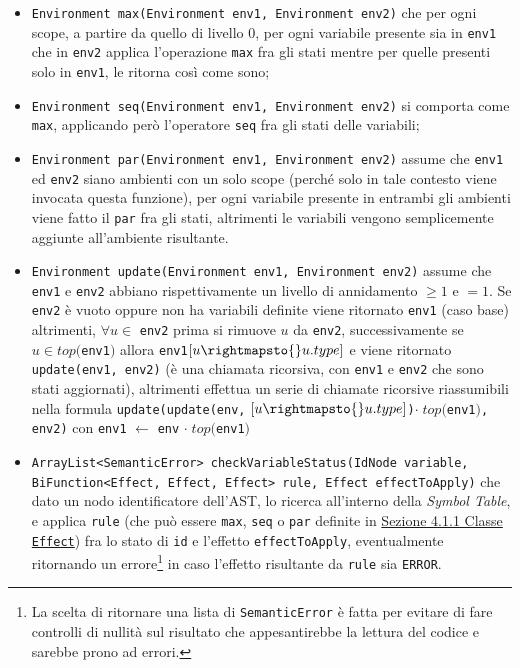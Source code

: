 \documentclass[../report.tex]{subfiles}
\begin{document}
\begin{itemize}
    \item \verb|Environment max(Environment env1, Environment env2)| che per ogni scope, a partire da quello di livello $0$, per ogni variabile presente sia in \verb|env1| che in \verb|env2| applica l'operazione \verb|max| fra gli stati mentre per quelle presenti solo in \verb|env1|, le ritorna così come sono;
    \item \verb|Environment seq(Environment env1, Environment env2)| si comporta come \verb|max|, applicando però l'operatore \verb|seq| fra gli stati delle variabili;
    \item \verb|Environment par(Environment env1, Environment env2)| assume che \verb|env1| ed \verb|env2| siano ambienti con un solo scope (perché solo in tale contesto viene invocata questa funzione), per ogni variabile presente in entrambi gli ambienti viene fatto il \verb|par| fra gli stati, altrimenti le variabili vengono semplicemente aggiunte all'ambiente risultante.
    \item \verb|Environment update(Environment env1, Environment env2)| assume che \verb|env1| e \verb|env2| abbiano rispettivamente un livello di annidamento $\geq{} 1$ e $= 1$.
    Se \verb|env2| è vuoto oppure non ha variabili definite viene ritornato \verb|env1| (caso base) altrimenti, $\forall u \in$ \verb|env2| prima si rimuove $u$ da \verb|env2|, successivamente se $u \in top($\verb|env1|$)$ allora \verb|env1|$[u \rightmapsto{} u.type]$ e viene ritornato \verb|update(env1, env2)| (è una chiamata ricorsiva, con \verb|env1| e \verb|env2| che sono stati aggiornati), altrimenti effettua un serie di chiamate ricorsive riassumibili nella formula \verb|update(update(env,| $[u \rightmapsto{} u.type]$\verb|)|$\cdot{}\; top($\verb|env1|$)$\verb|, env2)| con \verb|env1| $\leftarrow$ \verb|env| $\cdot{}\; top($\verb|env1|$)$
    \item \verb|ArrayList<SemanticError> checkVariableStatus(IdNode variable,|\\ \verb|BiFunction<Effect, Effect, Effect> rule, Effect effectToApply)| che dato un nodo identificatore dell'AST, lo ricerca all'interno della \textit{Symbol Table}, e applica \verb|rule| (che può essere \verb|max|, \verb|seq| o \verb|par| definite in \hyperref[ss:effect-effetti]{Sezione 4.1.1 Classe \texttt{Effect}}) fra lo stato di \verb|id| e l'effetto \verb|effectToApply|, eventualmente ritornando un errore\footnote{La scelta di ritornare una lista di \texttt{SemanticError} è fatta per evitare di fare controlli di nullità sul risultato che appesantirebbe la lettura del codice e sarebbe prono ad errori.} in caso l'effetto risultante da \verb|rule| sia \verb|ERROR|.
\end{itemize}
\end{document}
